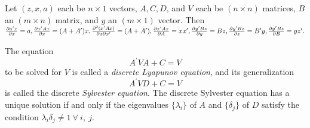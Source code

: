 \label{appendixLQA}
Let $(z,x,a)$ each be $n\times 1$ vectors, $A,C,D$, and $V$
each be $(n\times n)$ matrices, $B$ an $(m\times n)$ matrix, and $y$
an $(m\times 1)$ vector.  Then
$ {\partial a^\prime x\over \partial x} = a,
{\partial x^\prime A x\over \partial x} = (A + A^\prime) x,
{\partial^2 (x^\prime Ax)\over \partial x \partial x^\prime}=
(A+A^\prime),
{\partial x^\prime Ax\over \partial A} = x x^\prime,
{\partial y^\prime Bz\over \partial y} = Bz,
{\partial y^\prime Bz\over \partial z} = B^\prime y,
{\partial y^\prime Bz\over \partial B} = y z^\prime.$

The equation
$$A^\prime V A + C = V$$
to be solved for $V$ is called a {\it discrete Lyapunov equation}, and
its generalization
$$A^\prime V D + C = V$$
is called the discrete {\it Sylvester equation}.
The discrete Sylvester equation
%
 has a unique solution
if and only if the eigenvalues $\{\lambda_i\}$
of $A$ and $\{\delta_j\}$ of $D$ satisfy the condition
$\lambda_i \delta_j \not=  1 \ \forall \ i, \ j.$

